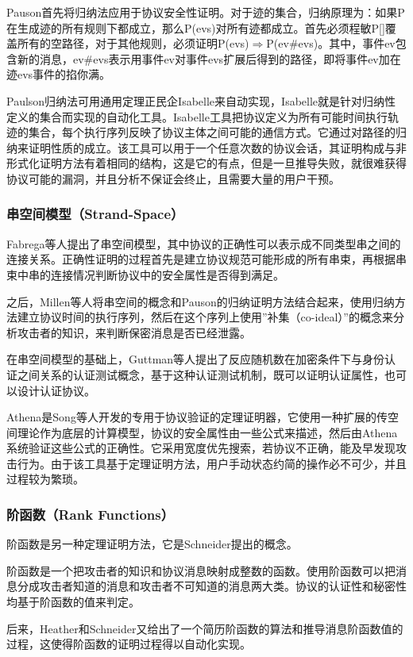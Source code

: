 \documentclass[cs4size,a4pape,UTF8]{ctexart}
\numberwithin{equation}{section}
\numberwithin{table}{section}
\numberwithin{figure}{section}
\begin{document}
Pauson首先将归纳法应用于协议安全性证明。对于迹的集合，归纳原理为：如果P在生成迹的所有规则下都成立，那么P(evs)对所有迹都成立。首先必须程敏P[]覆盖所有的空路径，对于其他规则，必须证明P(evs)$\Rightarrow$P(ev$\#$evs)。其中，事件ev包含新的消息，ev$\#$evs表示用事件ev对事件evs扩展后得到的路径，即将事件ev加在迹evs事件的掐你满。

Paulson归纳法可用通用定理正民企Isabelle来自动实现，Isabelle就是针对归纳性定义的集合而实现的自动化工具。Isabelle工具把协议定义为所有可能时间执行轨迹的集合，每个执行序列反映了协议主体之间可能的通信方式。它通过对路径的归纳来证明性质的成立。该工具可以用于一个任意次数的协议会话，其证明构成与非形式化证明方法有着相同的结构，这是它的有点，但是一旦推导失败，就很难获得协议可能的漏洞，并且分析不保证会终止，且需要大量的用户干预\cite{6}。


\subsubsection{串空间模型（Strand-Space）}
Fabrega等人提出了串空间模型，其中协议的正确性可以表示成不同类型串之间的连接关系。正确性证明的过程首先是建立协议规范可能形成的所有串束，再根据串束中串的连接情况判断协议中的安全属性是否得到满足。

之后，Millen等人将串空间的概念和Pauson的归纳证明方法结合起来，使用归纳方法建立协议时间的执行序列，然后在这个序列上使用''补集（co-ideal）''的概念来分析攻击者的知识，来判断保密消息是否已经泄露。

在串空间模型的基础上，Guttman等人提出了反应随机数在加密条件下与身份认证之间关系的认证测试概念，基于这种认证测试机制，既可以证明认证属性，也可以设计认证协议。

Athena是Song等人开发的专用于协议验证的定理证明器，它使用一种扩展的传空间理论作为底层的计算模型，协议的安全属性由一些公式来描述，然后由Athena系统验证这些公式的正确性。它采用宽度优先搜索，若协议不正确，能及早发现攻击行为。由于该工具基于定理证明方法，用户手动状态约简的操作必不可少，并且过程较为繁琐\cite{6}。

\subsubsection{阶函数（Rank Functions）}
阶函数是另一种定理证明方法，它是Schneider提出的概念。

阶函数是一个把攻击者的知识和协议消息映射成整数的函数。使用阶函数可以把消息分成攻击者知道的消息和攻击者不可知道的消息两大类。协议的认证性和秘密性均基于阶函数的值来判定。

后来，Heather和Schneider又给出了一个简历阶函数的算法和推导消息阶函数值的过程，这使得阶函数的证明过程得以自动化实现\cite{6}。
\end{document}
